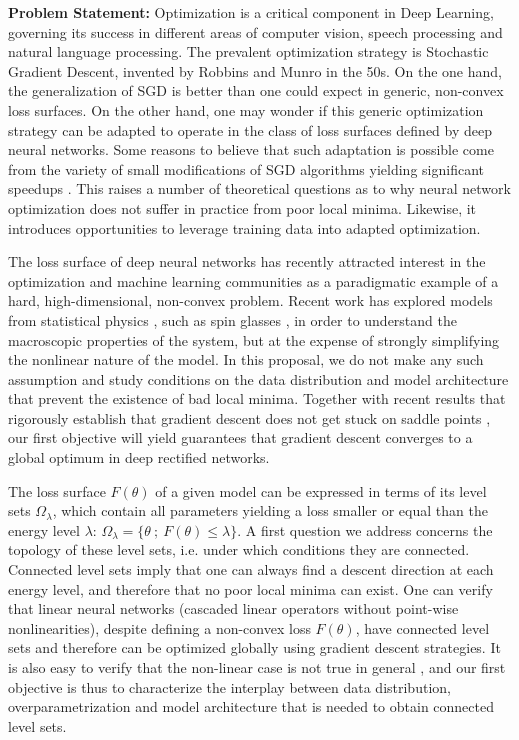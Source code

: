 \documentclass[10pt]{article}
\begin{document}
\vspace{0.5cm}
\noindent
\textbf{Problem Statement:}
Optimization is a critical component in Deep Learning, governing its success in different areas of computer vision, speech processing and natural language processing. The prevalent optimization strategy is Stochastic Gradient Descent, invented by Robbins and Munro in the 50s. On the one hand, the generalization of SGD is better than one could expect 
in generic, non-convex loss surfaces. On the other hand, one may wonder if this generic optimization strategy can be adapted to operate in the class of loss surfaces defined by deep neural networks. Some reasons to believe that such adaptation is possible come from the 
variety of small modifications of SGD algorithms yielding significant speedups \cite{duchi2011adaptive, hinton2012lecture, kingma2014adam}.
This raises a number of theoretical questions as to why neural network optimization does not suffer in practice from poor local minima. Likewise, it introduces opportunities to leverage training data into adapted optimization. 

The loss surface of deep neural networks has recently attracted interest 
in the optimization and machine learning communities as a paradigmatic example of 
a hard, high-dimensional, non-convex problem. 
Recent work has explored models from statistical physics \cite{dauphin2014identifying}, such as spin glasses \cite{choromanska2015loss}, 
in order to understand the macroscopic properties of the system, but at the expense of strongly simplifying the nonlinear nature of the model.
In this proposal, we do not make any such assumption and study conditions 
on the data distribution and model architecture that prevent the existence 
of bad local minima. Together with 
recent results that rigorously establish that gradient descent does not 
get stuck on saddle points \cite{lee2016gradient}, our first objective will yield guarantees that gradient descent converges
to a global optimum in deep rectified networks. 

The loss surface $F(\theta)$ of a given model can be expressed in terms of its level sets $\Omega_\lambda$, which contain all parameters yielding a loss smaller or equal than the energy level $\lambda$: $\Omega_\lambda = \{ \theta ~;~F(\theta) \leq \lambda\}$. 
A first question we address concerns the topology of these level sets, i.e. under which conditions they are connected. Connected level sets imply that one can always find a descent direction at each energy level, and therefore that no poor local minima can exist. One can verify that linear neural networks (cascaded linear operators without point-wise nonlinearities), despite defining a non-convex loss $F(\theta)$, have connected level sets and therefore can be optimized globally using gradient descent strategies. It is also easy to verify that the non-linear case is not true in general \cite{shamir}, and our first objective is thus to characterize the interplay between data distribution, overparametrization and model architecture that is needed to obtain connected level sets. 
\end{document}
